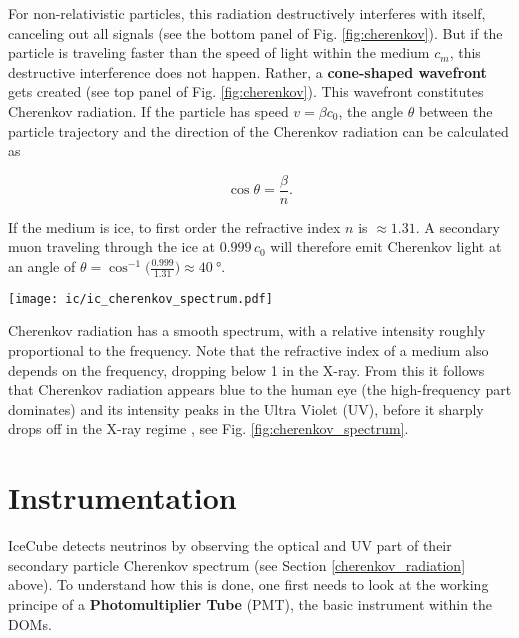 For non-relativistic particles, this radiation destructively interferes with itself, canceling out all signals (see the bottom panel of Fig. \ref{fig:cherenkov}). But if the particle is traveling faster than the speed of light within the medium $c_m$, this destructive interference does not happen. Rather, a \textbf{cone-shaped wavefront} gets created (see top panel of Fig. \ref{fig:cherenkov}). This wavefront constitutes Cherenkov radiation. If the particle has speed $v=\beta c_0$, the angle $\theta$ between the particle trajectory and the direction of the Cherenkov radiation can be calculated as 

\begin{equation}
\cos{\theta} = \frac{\beta}{n}.
\end{equation}

If the medium is ice, to first order the refractive index $n$ is $\approx1.31$. A secondary muon traveling through the ice at $0.999\,c_0$ will therefore emit Cherenkov light at an angle of $\theta = \cos^{-1}{\big(\frac{0.999}{1.31}\big)} \approx \SI{40}{\degree}$. 
\begin{marginfigure}
    \texttt{[image: ic/ic\_cherenkov\_spectrum.pdf]}
    \caption[Cherenkov spectrum]{Cherenkov spectrum for a particle with $v=0.8 \,c_0$ in water. The intensity peaks at $\SI{4e15}{\Hz}$, corresponding to a wavelength of \SI{75}{\nm}, lying at the high-frequency end of the UV spectrum. Adapted from \cite{Fulop1992}.}
\end{marginfigure}
Cherenkov radiation has a smooth spectrum, with a relative intensity roughly proportional to the frequency. Note that the refractive index of a medium also depends on the frequency, dropping below 1 in the X-ray. From this it follows that Cherenkov radiation appears blue to the human eye (the high-frequency part dominates) and its intensity peaks in the Ultra Violet (UV), before it sharply drops off in the X-ray regime , see Fig. \ref{fig:cherenkov_spectrum}.

\section{Instrumentation}

IceCube detects neutrinos by observing the optical and UV part of their secondary particle Cherenkov spectrum (see Section \ref{cherenkov_radiation} above). To understand how this is done, one first needs to look at the working principe of a \textbf{Photomultiplier Tube} (PMT), the basic instrument within the DOMs.

